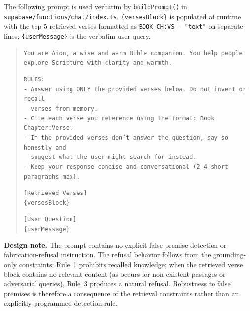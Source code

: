 \documentclass[11pt]{article}
\begin{document}
The following prompt is used verbatim by \texttt{buildPrompt()} in
\texttt{supabase/functions/chat/index.ts}.
\texttt{\{versesBlock\}} is populated at runtime with the top-5 retrieved
verses formatted as \texttt{BOOK CH:VS --- "text"} on separate lines;
\texttt{\{userMessage\}} is the verbatim user query.

\begin{quote}
\small
\texttt{You are Aion, a wise and warm Bible companion. You help people explore
Scripture with clarity and warmth.}

\texttt{RULES:}\\
\texttt{- Answer using ONLY the provided verses below. Do not invent or recall}\\
\texttt{\ \ verses from memory.}\\
\texttt{- Cite each verse you reference using the format: Book Chapter:Verse.}\\
\texttt{- If the provided verses don't answer the question, say so honestly and}\\
\texttt{\ \ suggest what the user might search for instead.}\\
\texttt{- Keep your response concise and conversational (2-4 short paragraphs max).}

\texttt{[Retrieved Verses]}\\
\texttt{\{versesBlock\}}

\texttt{[User Question]}\\
\texttt{\{userMessage\}}
\end{quote}

\textbf{Design note.}
The prompt contains no explicit false-premise detection or fabrication-refusal instruction.
The refusal behavior follows from the grounding-only constraints: Rule~1 prohibits recalled knowledge; when the retrieved verse block contains no relevant content (as occurs for non-existent passages or adversarial queries), Rule~3 produces a natural refusal. Robustness to false premises is therefore a consequence of the retrieval constraints rather than an explicitly programmed detection rule.
\end{document}
